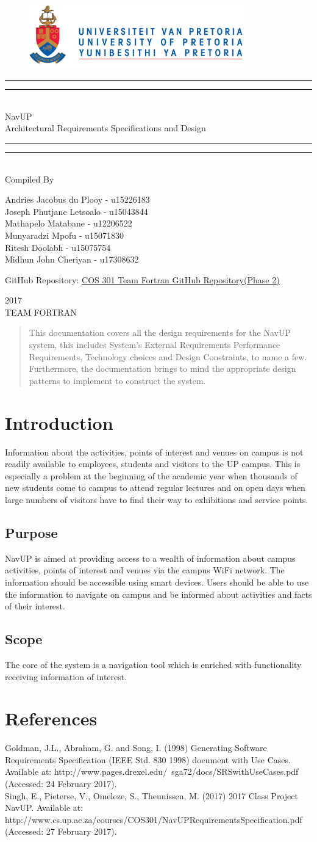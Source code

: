 \documentclass{article}
\newcommand*{\titleGP}{\begingroup
		\begin{figure}[t]
			\centering
			\includegraphics[width=350px]{UP_Logo.PNG}
		\end{figure}
\centering 
\vspace*{\baselineskip}

\rule{\textwidth}{1.6pt}\vspace*{-\baselineskip}\vspace*{2pt}
\rule{\textwidth}{0.4pt}\\[\baselineskip]

{\LARGE NavUP\\ [0.3\baselineskip] Architectural Requirements Specifications and Design } \\ [0.2\baselineskip]
\rule{\textwidth}{0.4pt}\vspace*{-\baselineskip}\vspace{3.2pt}
\rule{\textwidth}{1.6pt}\\[\baselineskip] %



Compiled By \\[\baselineskip]
{\Large Andries Jacobus du Plooy - u15226183 \\ Joseph Phutjane Letsoalo - u15043844 \\ Mathapelo Matabane - u12206522 \\ Munyaradzi Mpofu - u15071830\\ Ritesh Doolabh - u15075754 \\ Midhun John Cheriyan - u17308632\par}

\bigskip
\bigskip

 	GitHub Repository:  
 	\href{https://github.com/RitzDoolabh/COS301-Team_Fortran}{COS 301 Team Fortran GitHub Repository(Phase 2)}




 

\vfill


{\scshape 2017} \\[0.3\baselineskip]
{\large TEAM FORTRAN}\par

\endgroup}
\begin{document}
\titleGP
\newpage


\begin{abstract}
\noindent This documentation covers all the design requirements for the NavUP system, this includes System's External Requirements Performance Requirements, Technology choices and Design Constraints, to name a few. Furthermore, the documentation brings to mind the appropriate design patterns to implement to construct the system.
\end{abstract}

\newpage
\tableofcontents

\newpage
\section{Introduction}
Information about the activities, points of interest and venues on campus is not
readily available to employees, students and visitors to the UP campus. This is
especially a problem at the beginning of the academic year when thousands of new
students come to campus to attend regular lectures and on open days when large
numbers of visitors have to find their way to exhibitions and service points.

\subsection{Purpose}
NavUP is aimed at providing access to a wealth of information about campus
activities, points of interest and venues via the campus WiFi network. The information
should be accessible using smart devices. Users should be able to use the
information to navigate on campus and be informed about activities and facts of their
interest.
\subsection{Scope}
The core of the system is a navigation tool which is enriched with functionality
receiving information of interest.

\section{References}
Goldman, J.L., Abraham, G. and Song, I. (1998) Generating Software Requirements Specification (IEEE Std. 830 1998) document with Use Cases. \\ Available at: http://www.pages.drexel.edu/~sga72/docs/SRSwithUseCases.pdf \\(Accessed: 24 February 2017).\\
\noindent Singh, E., Pieterse, V., Omeleze, S., Theunissen, M. (2017) 2017 Class Project NavUP. Available at: http://www.cs.up.ac.za/courses/COS301/NavUPRequirementsSpecification.pdf (Accessed: 27 February 2017).\\ 
\newpage
\end{document}
